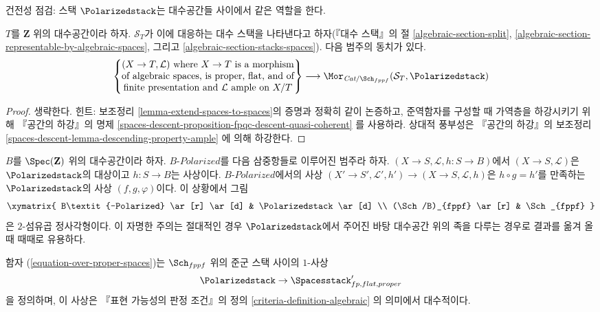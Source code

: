 \noindent
건전성 점검: 스택 $\Polarizedstack$는 대수공간들 사이에서 같은 역할을 한다.

\begin{lemma}
\label{lemma-extend-polarized-to-spaces}
$T$를 $\mathbf{Z}$ 위의 대수공간이라 하자. $\mathcal{S}_T$가 이에 대응하는
대수 스택을 나타낸다고 하자(『대수 스택』의 절
\ref{algebraic-section-split},
\ref{algebraic-section-representable-by-algebraic-spaces}, 그리고
\ref{algebraic-section-stacks-spaces}).
다음 범주의 동치가 있다.
$$
\left\{
\begin{matrix}
(X \to T, \mathcal{L})\text{ where }X \to T\text{ is a morphism}\\
\text{of algebraic spaces, is proper, flat, and of}\\
\text{finite presentation and }\mathcal{L}\text{ ample on }X/T
\end{matrix}
\right\}
\longrightarrow
\Mor_{\textit{Cat}/\Sch_{fppf}}(\mathcal{S}_T, \Polarizedstack)
$$
\end{lemma}

\begin{proof}
생략한다. 힌트: 보조정리 \ref{lemma-extend-spaces-to-spaces}의 증명과 정확히
같이 논증하고, 준역함자를 구성할 때 가역층을 하강시키기 위해
『공간의 하강』의 명제
\ref{spaces-descent-proposition-fpqc-descent-quasi-coherent}
를 사용하라. 상대적 풍부성은 『공간의 하강』의 보조정리
\ref{spaces-descent-lemma-descending-property-ample}
에 의해 하강한다.
\end{proof}

\begin{remark}
\label{remark-polarized-base-change}
$B$를 $\Spec(\mathbf{Z})$ 위의 대수공간이라 하자.
$B\textit{-Polarized}$를 다음 삼중항들로 이루어진 범주라 하자.
$(X \to S, \mathcal{L}, h : S \to B)$에서 $(X \to S, \mathcal{L})$은
$\Polarizedstack$의 대상이고 $h : S \to B$는 사상이다.
$B\textit{-Polarized}$에서의 사상
$(X' \to S', \mathcal{L}', h') \to (X \to S, \mathcal{L}, h)$은
$h \circ g = h'$를 만족하는 $\Polarizedstack$의 사상 $(f, g, \varphi)$이다.
이 상황에서 그림
$$
\xymatrix{
B\textit{-Polarized} \ar[r] \ar[d] & \Polarizedstack \ar[d] \\
(\Sch/B)_{fppf} \ar[r] & \Sch_{fppf}
}
$$
은 $2$-섬유곱 정사각형이다. 이 자명한 주의는 절대적인 경우
$\Polarizedstack$에서 주어진 바탕 대수공간 위의 족을 다루는 경우로
결과를 옮겨 올 때 때때로 유용하다.
\end{remark}

\begin{lemma}
\label{lemma-polarized-to-spaces-algebraic}
함자 (\ref{equation-over-proper-spaces})는 $\Sch_{fppf}$ 위의 준군 스택 사이의
$1$-사상
$$
\Polarizedstack \to \Spacesstack'_{fp, flat, proper}
$$
을 정의하며, 이 사상은 『표현 가능성의 판정 조건』의 정의
\ref{criteria-definition-algebraic}
의 의미에서 대수적이다.
\end{lemma}

